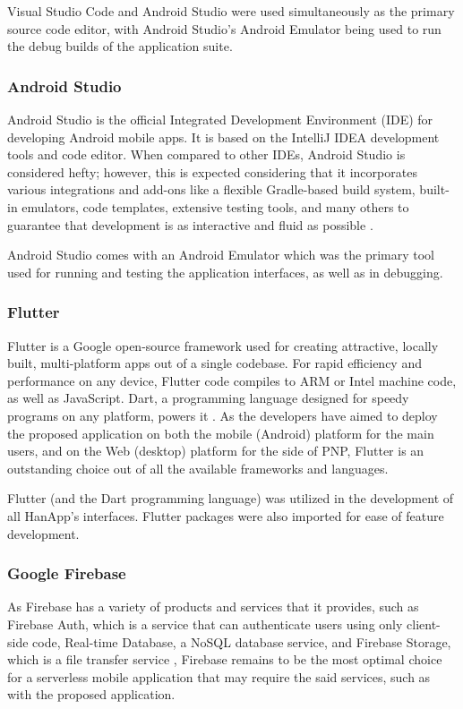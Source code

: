 Visual Studio Code and Android Studio were used simultaneously as the primary source code editor, with Android Studio's Android Emulator being used to run the debug builds of the application suite.  

\subsubsection{Android Studio}
Android Studio is the official Integrated Development Environment (IDE) for developing Android mobile apps. It is based on the IntelliJ IDEA development tools and code editor. When compared to other IDEs, Android Studio is considered hefty; however, this is expected considering that it incorporates various integrations and add-ons like a flexible Gradle-based build system, built-in emulators, code templates, extensive testing tools, and many others to guarantee that development is as interactive and fluid as possible \cite{androidStudio}.

Android Studio comes with an Android Emulator which was the primary tool used for running and testing the application interfaces, as well as in debugging.

\subsubsection{Flutter}
Flutter is a Google open-source framework used for creating attractive, locally built, multi-platform apps out of a single codebase. For rapid efficiency and performance on any device, Flutter code compiles to ARM or Intel machine code, as well as JavaScript. Dart, a programming language designed for speedy programs on any platform, powers it \cite{flutter}. As the developers have aimed to deploy the proposed application on both the mobile (Android) platform for the main users, and on the Web (desktop)  platform for the side of PNP, Flutter is an outstanding choice out of all the available frameworks and languages.

Flutter (and the Dart programming language) was utilized in the development of all HanApp's interfaces. Flutter packages were also imported for ease of feature development.

\subsubsection{Google Firebase}
As Firebase has a variety of products and services that it provides, such as Firebase Auth, which is a service that can authenticate users using only client-side code, Real-time Database, a NoSQL database service, and Firebase Storage, which is a file transfer service \cite{khawas2018application}, Firebase remains to be the most optimal choice for a serverless mobile application that may require the said services, such as with the proposed application.

